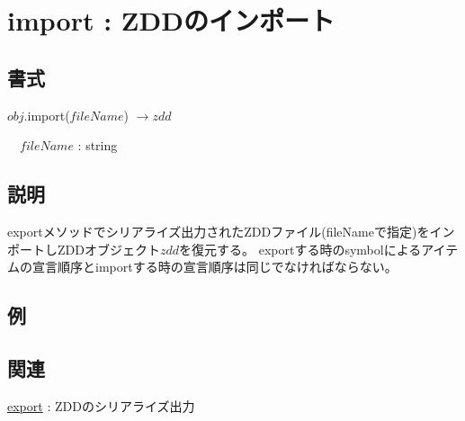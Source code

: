 
\section{import : ZDDのインポート\label{sect:import}}
\subsection*{書式}
$obj$.import($fileName$) $\rightarrow zdd$

~~$fileName$ : string

\subsection*{説明}
exportメソッドでシリアライズ出力されたZDDファイル(fileNameで指定)をインポートしZDDオブジェクト$zdd$を復元する。
exportする時のsymbolによるアイテムの宣言順序とimportする時の宣言順序は同じでなければならない。

\subsection*{例}


\subsection*{関連}
\hyperref[sect:export]{export} : ZDDのシリアライズ出力

